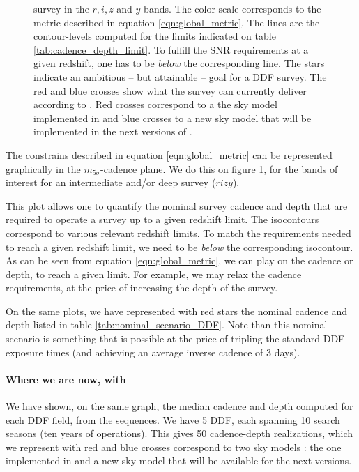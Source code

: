 \documentclass[\docopts]{\docclass}
\begin{document}
\begin{figure}[t]
\begin{center}
{  survey in the $r,i,z$ and $y$-bands. The color scale corresponds to
  the metric described in equation \ref{eqn:global_metric}.  The lines are
  the contour-levels computed for the limits indicated on table
  \ref{tab:cadence_depth_limit}. To fulfill the SNR requirements at a
  given redshift, one has to be {\em below} the corresponding
  line. The stars indicate an ambitious -- but attainable -- goal for
  a DDF survey.  The red and blue crosses show what the survey can currently
  deliver according to .  Red crosses correspond to
  a the sky model implemented in  and blue crosses to a
  new sky model that will be implemented in the next versions of . }
\label{fig:m5_cadence_limits_ddf}
\end{center}
\end{figure}

The constrains described in equation \ref{eqn:global_metric} can be
represented graphically in the $m_{5\sigma}$-cadence plane. We do this
on figure \ref{fig:m5_cadence_limits_ddf}, for the bands of interest
for an intermediate and/or deep survey ($rizy$).

This plot allows one to quantify the nominal survey cadence and depth
that are required to operate a survey up to a given redshift limit.
The isocontours correspond to various relevant redshift limits. To
match the requirements needed to reach a given redshift limit, we need
to be {\em below} the corresponding isocontour. As can be seen from
equation \ref{eqn:global_metric}, we can play on the cadence or depth,
to reach a given limit. For example, we may relax the cadence
requirements, at the price of increasing the depth of the survey.

On the same plots, we have represented with red stars the nominal
cadence and depth listed in table \ref{tab:nominal_scenario_DDF}.
Note than this nominal scenario is something that is possible at the
price of tripling the standard DDF exposure times (and achieving an
average inverse cadence of 3 days).



\paragraph{Where we are now, with } We have shown,
on the same graph, the median cadence and depth computed for each DDF
field, from the  sequences. We have 5 DDF, each
spanning 10 search seasons (ten years of operations).  This gives 50
cadence-depth realizations, which we represent with red and blue
crosses correspond to two sky models : the one implemented in
 \cite{1991PASP..103.1033K} and a new sky model
that will be available for the next  versions.
\end{document}
